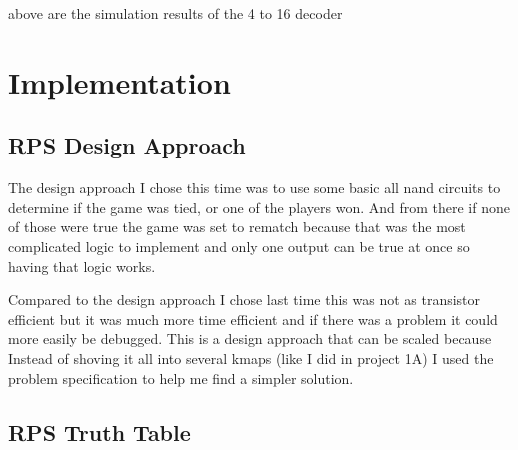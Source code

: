 \documentclass{article}
\begin{document}
\begin{center}
    
    above are the simulation results of the 4 to 16 decoder
\end{center}
\section{Implementation}
\subsection{RPS Design Approach}
The design approach I chose this time was to use some basic all nand circuits to determine if the game was tied, or one of the players won. And from there if none of those were true the game was set to rematch because that was the most complicated logic to implement and only one output can be true at once so having that logic works.

Compared to the design approach I chose last time this was not as transistor efficient but it was much more time efficient and if there was a problem it could more easily be debugged. This is a design approach that can be scaled because Instead of shoving it all into several kmaps (like I did in project 1A) I used the problem specification to help me find a simpler solution.
\newpage

\subsection{RPS Truth Table}
\end{document}
